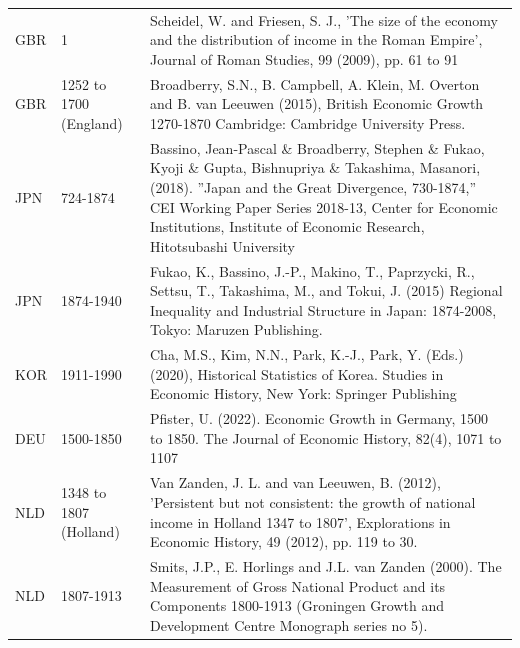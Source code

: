 \documentclass[11pt,a4paper]{article}
\begin{document}
\begin{longtable}{lp{2.2cm}p{11cm}}
GBR & 1 & Scheidel, W. and Friesen, S. J., 'The size of the economy and the distribution of income in the Roman Empire', Journal of Roman Studies, 99 (2009), pp. 61 to 91\\
GBR & 1252 to 1700 (England) & Broadberry, S.N., B. Campbell, A. Klein, M. Overton and B. van Leeuwen (2015), British Economic Growth 1270-1870 Cambridge: Cambridge University Press.\\
JPN & 724-1874 & Bassino, Jean-Pascal \& Broadberry, Stephen \& Fukao, Kyoji \& Gupta, Bishnupriya \& Takashima, Masanori, (2018). ''Japan and the Great Divergence, 730-1874,'' CEI Working Paper Series 2018-13, Center for Economic Institutions, Institute of Economic Research, Hitotsubashi University\\
JPN & 1874-1940 & Fukao, K., Bassino, J.-P., Makino, T., Paprzycki, R., Settsu, T., Takashima, M., and Tokui, J. (2015) Regional Inequality and Industrial Structure in Japan: 1874-2008, Tokyo: Maruzen Publishing.\\
KOR & 1911-1990 & Cha, M.S., Kim, N.N., Park, K.-J., Park, Y. (Eds.) (2020), Historical Statistics of Korea. Studies in Economic History, New York: Springer Publishing\\
DEU & 1500-1850 & Pfister, U. (2022). Economic Growth in Germany, 1500 to 1850. The Journal of Economic History, 82(4), 1071 to 1107\\
NLD & 1348 to 1807 (Holland) & Van Zanden, J. L. and van Leeuwen, B. (2012), 'Persistent but not consistent: the growth of national income in Holland 1347 to 1807', Explorations in Economic History, 49 (2012), pp. 119 to 30.\\
NLD & 1807-1913 & Smits, J.P., E. Horlings and J.L. van Zanden (2000). The Measurement of Gross National Product and its Components 1800-1913 (Groningen Growth and Development Centre Monograph series no 5).\\
\bottomrule\end{longtable}
\end{document}
